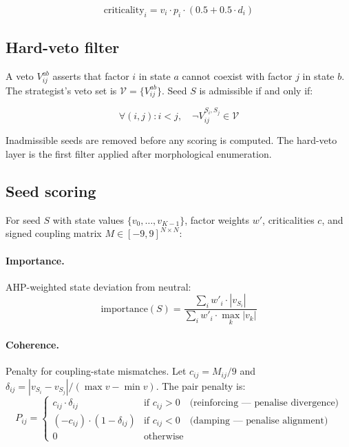 \documentclass[11pt,a4paper]{article}
\begin{document}
\begin{equation}
\text{criticality}_i = v_i \cdot p_i \cdot (0.5 + 0.5 \cdot d_i)
\end{equation}

\subsection{Hard-veto filter}

A veto $V_{ij}^{ab}$ asserts that factor $i$ in state $a$ cannot coexist with factor $j$ in state $b$. The strategist's veto set is $\mathcal{V} = \{V_{ij}^{ab}\}$. Seed $S$ is admissible if and only if:

\begin{equation}
\forall (i, j) : i < j, \quad \neg V_{ij}^{S_i, S_j} \in \mathcal{V}
\end{equation}

Inadmissible seeds are removed before any scoring is computed. The hard-veto layer is the first filter applied after morphological enumeration.

\subsection{Seed scoring}

For seed $S$ with state values $\{v_0, \ldots, v_{K-1}\}$, factor weights $w'$, criticalities $c$, and signed coupling matrix $M \in [-9, 9]^{N \times N}$:

\paragraph{Importance.} AHP-weighted state deviation from neutral:
\begin{equation}
\text{importance}(S) = \frac{\sum_i w'_i \cdot |v_{S_i}|}{\sum_i w'_i \cdot \max_k |v_k|}
\end{equation}

\paragraph{Coherence.} Penalty for coupling-state mismatches. Let $c_{ij} = M_{ij}/9$ and $\delta_{ij} = |v_{S_i} - v_{S_j}|/(\max v - \min v)$. The pair penalty is:
\begin{equation}
P_{ij} = \begin{cases}
c_{ij} \cdot \delta_{ij} & \text{if } c_{ij} > 0 \quad \text{(reinforcing — penalise divergence)}\\
(-c_{ij}) \cdot (1 - \delta_{ij}) & \text{if } c_{ij} < 0 \quad \text{(damping — penalise alignment)}\\
0 & \text{otherwise}
\end{cases}
\end{equation}
\end{document}
